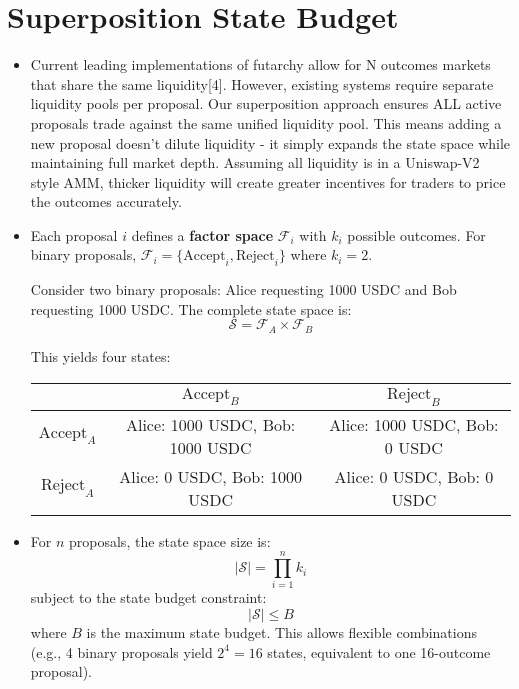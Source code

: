\documentclass{article}
\begin{document}
\section{Superposition State Budget}
\begin{itemize}
    \item Current leading implementations of futarchy allow for N outcomes 
    markets that share the same liquidity[4]. However, existing systems 
    require separate liquidity pools per proposal. Our superposition approach 
    ensures ALL active proposals trade against the same unified liquidity pool. 
    This means adding a new proposal doesn't dilute liquidity - it simply 
    expands the state space while maintaining full market depth. Assuming all liquidity is in a Uniswap-V2 style AMM, thicker liquidity will create greater incentives for traders to price the outcomes accurately.

    
    \item Each proposal $i$ defines a \textbf{factor space} $\mathcal{F}_i$ with $k_i$ possible outcomes. For binary proposals, $\mathcal{F}_i = \{\text{Accept}_i, \text{Reject}_i\}$ where $k_i = 2$.
    
    Consider two binary proposals: Alice requesting 1000 USDC and Bob requesting 1000 USDC. The complete state space is:
    \begin{equation}
    \mathcal{S} = \mathcal{F}_A \times \mathcal{F}_B
    \end{equation}
    
    This yields four states:
    \begin{center}
    \begin{tabular}{|c|c|c|}
    \hline
    & $\text{Accept}_B$ & $\text{Reject}_B$ \\
    \hline
    $\text{Accept}_A$ & Alice: 1000 USDC, Bob: 1000 USDC & Alice: 1000 USDC, Bob: 0 USDC \\
    \hline
    $\text{Reject}_A$ & Alice: 0 USDC, Bob: 1000 USDC & Alice: 0 USDC, Bob: 0 USDC \\
    \hline
    \end{tabular}
    \end{center}
    
    \item For $n$ proposals, the state space size is:
    \begin{equation}
    |\mathcal{S}| = \prod_{i=1}^{n} k_i
    \end{equation}
    subject to the state budget constraint:
    \begin{equation}
    |\mathcal{S}| \leq B
    \end{equation}
    where $B$ is the maximum state budget. This allows flexible combinations (e.g., 4 binary proposals yield $2^4 = 16$ states, equivalent to one 16-outcome proposal).
    

\end{itemize}
\end{document}
